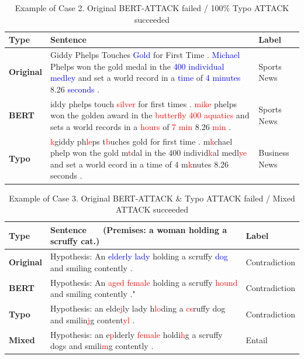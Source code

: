 \documentclass[11pt,a4paper]{article}
\newcommand{\red}[1]{\textcolor{red}{#1}}
\newcommand{\blue}[1]{\textcolor{blue}{#1}}
\begin{document}
{\renewcommand{\arraystretch}{1.5}
\begin{table}[h!]
{\small
\begin{tabularx}{\textwidth}{l|X|l}
\hline
\textbf{Type} & \textbf{Sentence}  & \textbf{Label} \\ \hline
\textbf{Original}  & Giddy Phelps Touches \blue{Gold} for First Time . \blue{Michael} Phelps won the gold medal in the \blue{400 individual medley} and set a world record in a \blue{time} of \blue{4 minutes} 8.26 \blue{seconds} . & Sports News   \\ \hline
\textbf{BERT} & iddy phelps touch \red{silver} for first times . \red{mike} phelps won the golden award in the \red{butterfly 400 aquatics} and sets a world records in a \red{hours} of \red{7 min} 8.26 \red{min} .      & Sports News   \\ \hline
\textbf{Typo} & \red{k}giddy ph\red{le}ps t\red{b}uches gold for first time . m\red{k}chael phelp won the gold m\red{t}dal in the 400 individ\red{k}al medl\red{ye} and set a world ecord in a time of 4 m\red{k}nutes 8.26 seconds .  & Business News \\ \hline
\end{tabularx}
}
\caption{Example of Case 2. Original BERT-ATTACK failed / 100\% Typo ATTACK succeeded}
\end{table}
}

{\renewcommand{\arraystretch}{1.5}
\begin{table}[h!]
{\small
\begin{tabularx}{\textwidth}{l|X|l}
\hline
\textbf{Type} & \textbf{Sentence}$\qquad$(Premises: a woman holding a scruffy cat.) & \textbf{Label} \\ \hline
\textbf{Original}  & Hypothesis: An \blue{elderly lady} holding a scruffy \blue{dog} and smiling contently .     
& Contradiction \\ \hline
\textbf{BERT}  & Hypothesis: An \red{aged female} holding a scruffy \red{hound} and smiling contently ."    & Contradiction \\ \hline
\textbf{Typo}  & Hypothesis: an elde\red{j}ly lady h\red{lo}ding a \red{cs}ruffy dog and smilin\red{j}g content\red{yl} .    & Contradiction \\ \hline
\textbf{Mixed} & Hypothesis: an e\red{p}lderly \red{female} holdi\red{h}g a scruffy dogs and smili\red{m}g contently . & Entail        \\ \hline
\end{tabularx}
}
\caption{Example of Case 3. Original BERT-ATTACK \& Typo ATTACK failed / Mixed ATTACK succeeded}
\end{table}
}
\end{document}
